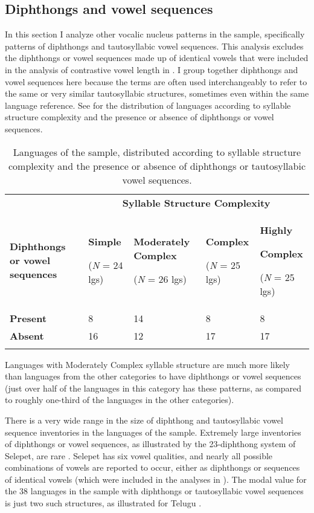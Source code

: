 \subsection{Diphthongs and vowel sequences}\label{sec:4.3.4}

  In this section I analyze other vocalic nucleus patterns in the sample, specifically patterns of diphthongs and tautosyllabic vowel sequences. This analysis excludes the diphthongs or vowel sequences made up of identical vowels that were included in the analysis of contrastive vowel length in . I group together diphthongs and vowel sequences here because the terms are often used interchangeably to refer to the same or very similar tautosyllabic structures, sometimes even within the same language reference. See  for the distribution of languages according to syllable structure complexity and the presence or absence of diphthongs or vowel sequences.

\begin{table}
\begin{tabularx}{\textwidth}{XXXXX}
 & \multicolumn{4}{c}{ \textbf{Syllable Structure Complexity}}\\
\lsptoprule
\textbf{Diphthongs or vowel sequences} & { \textbf{Simple}}

 (\textit{N} = 24 lgs) & { \textbf{Moderately Complex}}

 (\textit{N} = 26 lgs) & { \textbf{Complex}}

 (\textit{N} = 25 lgs) & { \textbf{Highly} }

{ \textbf{Complex}}

 (\textit{N} = 25 lgs)\\
\textbf{Present} & 8 & 14 & 8 & 8\\
\textbf{Absent} & 16 & 12 & 17 & 17\\
\lspbottomrule
\end{tabularx}
\caption{\label{tab:4.6}Languages of the sample, distributed according to syllable structure complexity and the presence or absence of diphthongs or tautosyllabic vowel sequences.}
\end{table}

  Languages with Moderately Complex syllable structure are much more likely than languages from the other categories to have diphthongs or vowel sequences (just over half of the languages in this category has these patterns, as compared to roughly one-third of the languages in the other categories).

  There is a very wide range in the size of diphthong and tautosyllabic vowel sequence inventories in the languages of the sample. Extremely large inventories of diphthongs or vowel sequences, as illustrated by the 23-diphthong system of Selepet, are rare . Selepet has six vowel qualities, and nearly all possible combinations of vowels are reported to occur, either as diphthongs or sequences of identical vowels (which were included in the analyses in ). The modal value for the 38 languages in the sample with diphthongs or tautosyllabic vowel sequences is just two such structures, as illustrated for Telugu .

